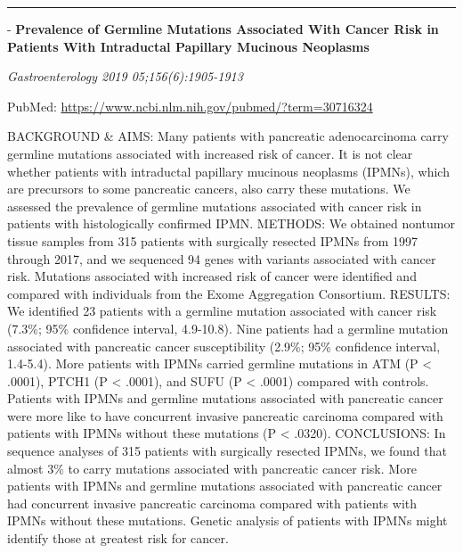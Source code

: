 \documentclass[]{article}
\begin{document}
{}

{}

\begin{center}\rule{0.5\linewidth}{\linethickness}\end{center}

 - \textbf{Prevalence of Germline Mutations Associated With Cancer Risk
in Patients With Intraductal Papillary Mucinous Neoplasms}

\emph{Gastroenterology 2019 05;156(6):1905-1913}

PubMed: \url{https://www.ncbi.nlm.nih.gov/pubmed/?term=30716324}

BACKGROUND \& AIMS: Many patients with pancreatic adenocarcinoma carry
germline mutations associated with increased risk of cancer. It is not
clear whether patients with intraductal papillary mucinous neoplasms
(IPMNs), which are precursors to some pancreatic cancers, also carry
these mutations. We assessed the prevalence of germline mutations
associated with cancer risk in patients with histologically confirmed
IPMN. METHODS: We obtained nontumor tissue samples from 315 patients
with surgically resected IPMNs from 1997 through 2017, and we sequenced
94 genes with variants associated with cancer risk. Mutations associated
with increased risk of cancer were identified and compared with
individuals from the Exome Aggregation Consortium. RESULTS: We
identified 23 patients with a germline mutation associated with cancer
risk (7.3\%; 95\% confidence interval, 4.9-10.8). Nine patients had a
germline mutation associated with pancreatic cancer susceptibility
(2.9\%; 95\% confidence interval, 1.4-5.4). More patients with IPMNs
carried germline mutations in ATM (P \textless{} .0001), PTCH1 (P
\textless{} .0001), and SUFU (P \textless{} .0001) compared with
controls. Patients with IPMNs and germline mutations associated with
pancreatic cancer were more like to have concurrent invasive pancreatic
carcinoma compared with patients with IPMNs without these mutations (P
\textless{} .0320). CONCLUSIONS: In sequence analyses of 315 patients
with surgically resected IPMNs, we found that almost 3\% to carry
mutations associated with pancreatic cancer risk. More patients with
IPMNs and germline mutations associated with pancreatic cancer had
concurrent invasive pancreatic carcinoma compared with patients with
IPMNs without these mutations. Genetic analysis of patients with IPMNs
might identify those at greatest risk for cancer.

{}

{}
\end{document}
